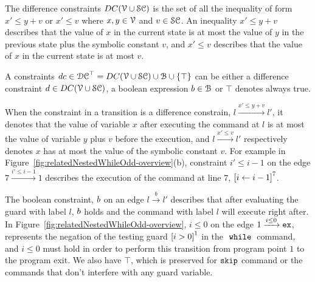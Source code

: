 \begin{defn}
 The difference constraints $DC(\mathcal{V} \cup \mathcal{SC})$ is the set of all the inequality of
form $x' \leq y + v$ or $x' \leq v$ where $x, y \in \mathcal{V} $ and $v \in \mathcal{SC}$.
An inequality $x' \leq y + v$ describes that the value of $x$ in the current state is
at most the value of $y$ in the previous state plus the symbolic constant $v$, and $x' \leq v$ describes that the value of $x$ in the current state is
at most $v$.
\end{defn}

\begin{defn}[Constraints]
A constraints $dc \in \mathcal{DC}^{\top} = DC(\mathcal{V} \cup \mathcal{SC}) \cup \mathcal{B}\cup \{\top\}$ can be either a
difference constraint $d \in DC(\mathcal{V} \cup \mathcal{SC})$, a boolean expression $b \in \mathcal{B}$
or $\top$ denotes always true.
\end{defn}

When the constraint in a transition is a difference constrain, $l \xrightarrow{x' \leq y + v} l'$,
it denotes that
the value of variable $x$
after executing the command at $l$ is at most
the value of variable $y$ plus $v$ before the execution,
and $l \xrightarrow{x' \leq v} l'$ respectively denotes
$x$ has at most
the value of the symbolic constant $v$.
For example in Figure~\ref{fig:relatedNestedWhileOdd-overview}(b), constraint $i' \leq i - 1$ on the edge $7 \xrightarrow{i' \leq i - 1} 1$
describes the execution of
 the command at line $7$, 
$\clabel{\assign{i}{i - 1}}^{7}$. 


The boolean constraint, $b$ on an edge $l \xrightarrow{b} l'$ describes
that after evaluating the guard with label $l$,
$b$ holds and the command with label $l$ will execute right after.
In Figure~\ref{fig:relatedNestedWhileOdd-overview}, $i \leq 0 $ on the edge $1 \xrightarrow{i \leq 0} \mathtt{ex}$, 
represents the negation of the testing guard $\clabel{i > 0}^1$
in the $\;\mathtt{while}\;$ command, and $i \leq 0$ must hold in order to perform this transition from program point $1$ to
the program exit. 
We also have $\top$, which is preserved for $\mathtt{skip}$ command or the commands that don't interfere with any guard variable.

